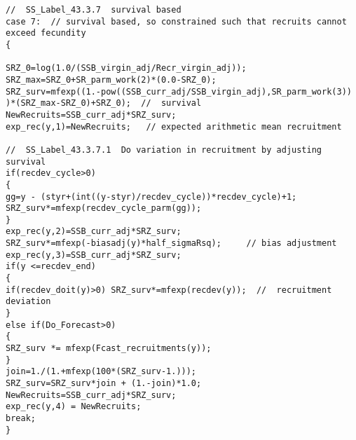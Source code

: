 \scriptsize
\begin{verbatim}
//  SS_Label_43.3.7  survival based
case 7:  // survival based, so constrained such that recruits cannot exceed fecundity
{

SRZ_0=log(1.0/(SSB_virgin_adj/Recr_virgin_adj));
SRZ_max=SRZ_0+SR_parm_work(2)*(0.0-SRZ_0);
SRZ_surv=mfexp((1.-pow((SSB_curr_adj/SSB_virgin_adj),SR_parm_work(3)) )*(SRZ_max-SRZ_0)+SRZ_0);  //  survival
NewRecruits=SSB_curr_adj*SRZ_surv;
exp_rec(y,1)=NewRecruits;   // expected arithmetic mean recruitment

//  SS_Label_43.3.7.1  Do variation in recruitment by adjusting survival
if(recdev_cycle>0)
{
gg=y - (styr+(int((y-styr)/recdev_cycle))*recdev_cycle)+1;
SRZ_surv*=mfexp(recdev_cycle_parm(gg));
}
exp_rec(y,2)=SSB_curr_adj*SRZ_surv;
SRZ_surv*=mfexp(-biasadj(y)*half_sigmaRsq);     // bias adjustment
exp_rec(y,3)=SSB_curr_adj*SRZ_surv;
if(y <=recdev_end)
{
if(recdev_doit(y)>0) SRZ_surv*=mfexp(recdev(y));  //  recruitment deviation
}
else if(Do_Forecast>0)
{
SRZ_surv *= mfexp(Fcast_recruitments(y));
}
join=1./(1.+mfexp(100*(SRZ_surv-1.)));
SRZ_surv=SRZ_surv*join + (1.-join)*1.0;
NewRecruits=SSB_curr_adj*SRZ_surv;
exp_rec(y,4) = NewRecruits;
break;
}
\end{verbatim}

\pagebreak
